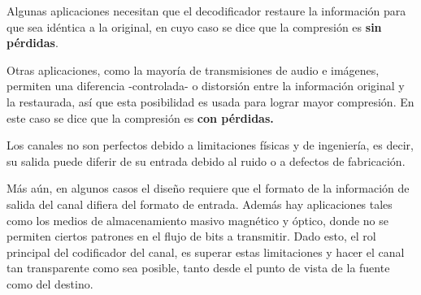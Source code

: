 Algunas aplicaciones necesitan que el decodificador restaure la información para que sea idéntica a la original, en cuyo caso se dice que la compresión es \textbf{sin pérdidas}.

Otras aplicaciones, como la mayoría de transmisiones de audio e imágenes, permiten una diferencia -controlada- o distorsión entre la información original y la restaurada, así que esta posibilidad es usada para lograr mayor compresión. En este caso se dice que la compresión es \textbf{con pérdidas.}

Los canales no son perfectos debido a limitaciones físicas y de ingeniería, es decir, su salida puede diferir de su entrada debido al ruido o a defectos de fabricación.

Más aún, en algunos casos el diseño requiere que el formato de la información de salida del canal difiera del formato de entrada. Además hay aplicaciones tales como los medios de almacenamiento masivo magnético y óptico, donde no se permiten ciertos patrones en el flujo de bits a transmitir. Dado esto, el rol principal del codificador del canal, es superar estas limitaciones y hacer el canal tan transparente  como sea posible, tanto desde el punto de vista de la fuente como del destino. 

